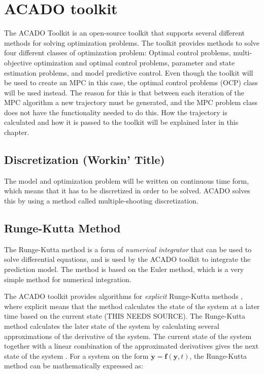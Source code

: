 \section{ACADO toolkit}

The ACADO Toolkit \cite{acadoHOUSKA} is an open-source toolkit that supports several different methods for solving optimization problems. The toolkit provides methods to solve four different classes of optimization problem: Optimal control problems, multi-objective optimization and optimal control problems, parameter and state estimation problems, and model predictive control. Even though the toolkit will be used to create an MPC in this case, the optimal control problems (OCP) class will be used instead. The reason for this is that between each iteration of the MPC algorithm a new trajectory must be generated, and the MPC problem class does not have the functionality needed to do this. How the trajectory is calculated and how it is passed to the toolkit will be explained later in this chapter.



\subsection{Discretization (Workin' Title)}

The model and optimization problem will be written on continuous time form, which means that it has to be discretized in order to be solved. ACADO solves this by using a method called multiple-shooting discretization.


\subsection{Runge-Kutta Method}

The Runge-Kutta method is a form of \textit{numerical integrator} that can be used to solve differential equations, and is used by the ACADO toolkit to integrate the prediction model. The method is based on the Euler method, which is a very simple method for numerical integration.

The ACADO toolkit provides algorithms for \textit{explicit} Runge-Kutta methods \cite{acadoHOUSKA}, where explicit means that the method calculates the state of the system at a later time based on the current state (THIS NEEDS SOURCE). The Runge-Kutta method calculates the later state of the system by calculating several approximations of the derivative of the system. The current state of the system together with a linear combination of the approximated derivatives gives the next state of the system \cite{modsimEGELAND}. For a system on the form $\mathbf{\dot{y}} = \mathbf{f}(\mathbf{y},t)$, the Runge-Kutta method can be mathematically expressed as:

